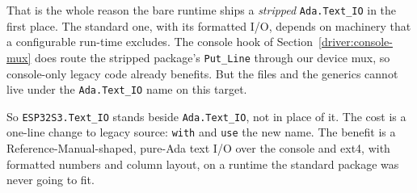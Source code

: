 That is the whole reason the bare runtime ships a \emph{stripped}
\texttt{Ada.Text\_IO} in the first place. The standard one, with its formatted
I/O, depends on machinery that a configurable run-time excludes. The console hook
of Section~\ref{driver:console-mux} does route the stripped package's
\texttt{Put\_Line} through our device mux, so console-only legacy code already
benefits. But the files and the generics cannot live under the
\texttt{Ada.Text\_IO} name on this target.

So \texttt{ESP32S3.Text\_IO} stands beside \texttt{Ada.Text\_IO}, not in place of
it. The cost is a one-line change to legacy source: \texttt{with} and \texttt{use}
the new name. The benefit is a Reference-Manual-shaped, pure-Ada text I/O over the
console and ext4, with formatted numbers and column layout, on a runtime the
standard package was never going to fit.
